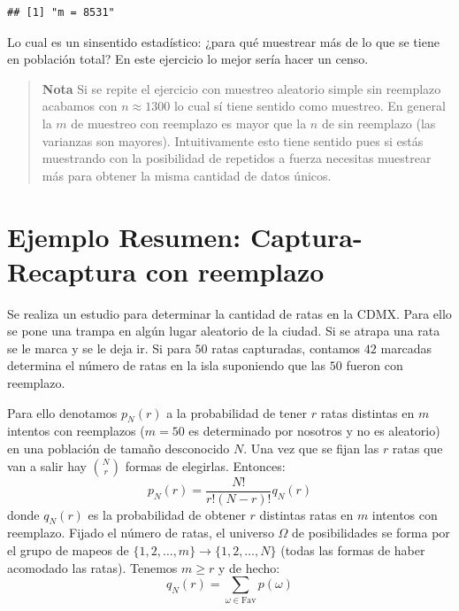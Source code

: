 \documentclass[
]{book}
\begin{document}
\begin{verbatim}
## [1] "m = 8531"
\end{verbatim}

Lo cual es un sinsentido estadístico: ¿para qué muestrear más de lo que se tiene en población total? En este ejercicio lo mejor sería hacer un censo.

\begin{quote}
\textbf{Nota} Si se repite el ejercicio con muestreo aleatorio simple sin reemplazo acabamos con \(n \approx 1300\) lo cual sí tiene sentido como muestreo. En general la \(m\) de muestreo con reemplazo es mayor que la \(n\) de sin reemplazo (las varianzas son mayores). Intuitivamente esto tiene sentido pues si estás muestrando con la posibilidad de repetidos a fuerza necesitas muestrear más para obtener la misma cantidad de datos únicos.
\end{quote}

\hypertarget{ejemplo-resumen-captura-recaptura-con-reemplazo}{%
\section{Ejemplo Resumen: Captura-Recaptura con reemplazo}\label{ejemplo-resumen-captura-recaptura-con-reemplazo}}

Se realiza un estudio para determinar la cantidad de ratas en la CDMX. Para ello se pone una trampa en algún lugar aleatorio de la ciudad. Si se atrapa una rata se le marca y se le deja ir. Si para \(50\) ratas capturadas, contamos \(42\) marcadas determina el número de ratas en la isla suponiendo que las \(50\) fueron con reemplazo.

Para ello denotamos \(p_N(r)\) a la probabilidad de tener \(r\) ratas distintas en \(m\) intentos con reemplazos (\(m = 50\) es determinado por nosotros y no es aleatorio) en una población de tamaño desconocido \(N\). Una vez que se fijan las \(r\) ratas que van a salir hay \(\binom{N}{r}\) formas de elegirlas. Entonces:
\[
p_N(r) = \dfrac{N!}{r!(N-r)!} q_N(r)
\]
donde \(q_N(r)\) es la probabilidad de obtener \(r\) distintas ratas en \(m\) intentos con reemplazo. Fijado el número de ratas, el universo \(\Omega\) de posibilidades se forma por el grupo de mapeos de \(\{1,2,\dots, m\}\to\{1,2,\dots, N\}\) (todas las formas de haber acomodado las ratas). Tenemos \(m \geq r\) y de hecho:
\[
q_N(r) = \sum_{\omega\in\text{Fav}} p(\omega)
\]
\end{document}
